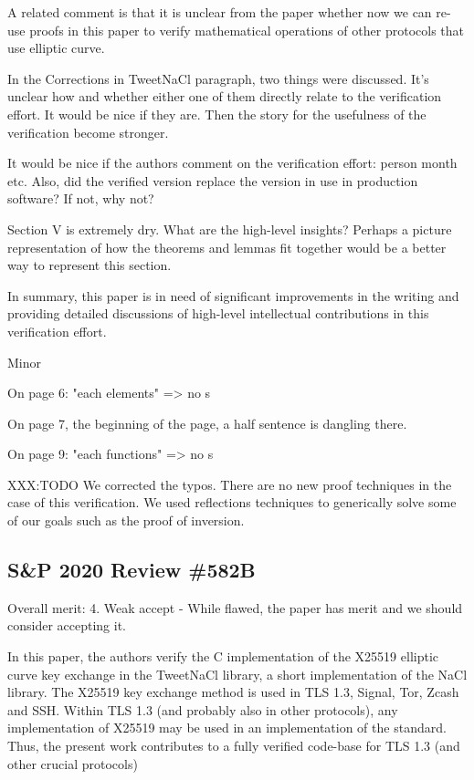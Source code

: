 A related comment is that it is unclear from the paper whether now we can re-use
proofs in this paper to verify  mathematical operations of other protocols that
use elliptic curve.

In the Corrections in TweetNaCl paragraph, two things were discussed. It's
unclear how and whether either one of them directly relate to the verification
effort. It would be nice if they are. Then the story for the usefulness of the
verification become stronger.

It would be nice if the authors comment on the verification effort: person month
etc. Also, did the verified version replace the version in use in production
software? If not, why not?

Section V is extremely dry. What are the high-level insights? Perhaps a picture
representation of how the theorems and lemmas fit together would be a better way
to represent this section.

In summary, this paper is in need of significant improvements in the writing and
providing detailed discussions of high-level intellectual contributions in this
verification effort.

Minor

On page 6: "each elements" => no s

On page 7, the beginning of the page, a half sentence is
dangling there.

On page 9: "each functions" => no s


XXX:TODO
We corrected the typos. There are no new proof techniques in the case of this
verification. We used reflections techniques to generically solve some of our
goals such as the proof of inversion.

\subsection{S\&P 2020 Review \#582B}

Overall merit: 4. Weak accept - While flawed, the paper has merit and we should
consider accepting it.


\begin{center}
\end{center}

In this paper, the authors verify the C implementation of the X25519 elliptic
curve key exchange in the TweetNaCl library, a short implementation of the NaCl
library. The X25519 key exchange method is used in TLS 1.3, Signal, Tor, Zcash
and SSH. Within TLS 1.3 (and probably also in other protocols), any implementation
of X25519 may be used in an implementation of the standard. Thus, the present
work contributes to a fully verified code-base for TLS 1.3 (and other crucial
protocols)

